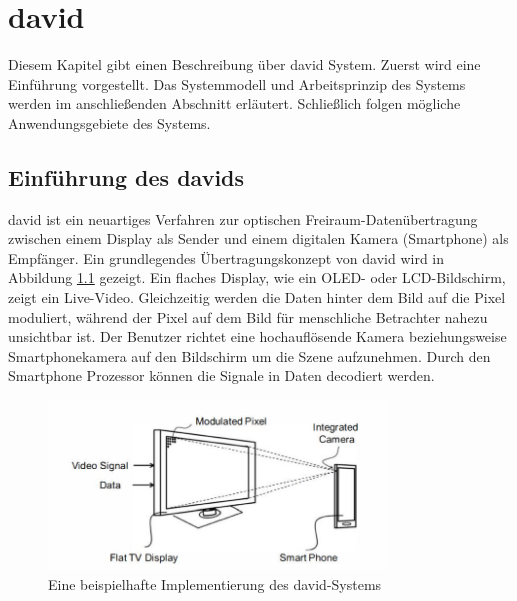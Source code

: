\chapter{\gls{david}} \label{cha:DaVid}


Diesem Kapitel gibt einen Beschreibung über \gls{david} System. Zuerst wird eine Einführung vorgestellt. Das Systemmodell und Arbeitsprinzip des Systems werden im anschließenden Abschnitt erläutert. Schließlich folgen mögliche Anwendungsgebiete des Systems. \cite{Kays2017,Kays2016,Kays201501,Kays201502}




\section{Einführung des \gls{david}s} 

\gls{david} ist ein neuartiges Verfahren zur optischen Freiraum-Datenübertragung zwischen einem Display als Sender und einem digitalen Kamera (Smartphone) als Empfänger. Ein grundlegendes Übertragungskonzept von \gls{david} wird in Abbildung \ref{fig:David1} gezeigt. Ein flaches Display, wie ein OLED- oder LCD-Bildschirm, zeigt ein Live-Video. Gleichzeitig werden die Daten hinter dem Bild auf die Pixel moduliert, während der Pixel auf dem Bild für menschliche Betrachter nahezu unsichtbar ist. Der Benutzer richtet eine hochauflösende Kamera beziehungsweise Smartphonekamera auf den Bildschirm um die Szene aufzunehmen. Durch den Smartphone Prozessor können die Signale  in Daten decodiert werden.

\begin{figure}[htb]
 \centering 
 \includegraphics[keepaspectratio,width=0.8\textwidth]{images/2_DaViD/David1.jpg}
 \caption{Eine beispielhafte Implementierung des \gls{david}-Systems}
 \label{fig:David1}
\end{figure}



